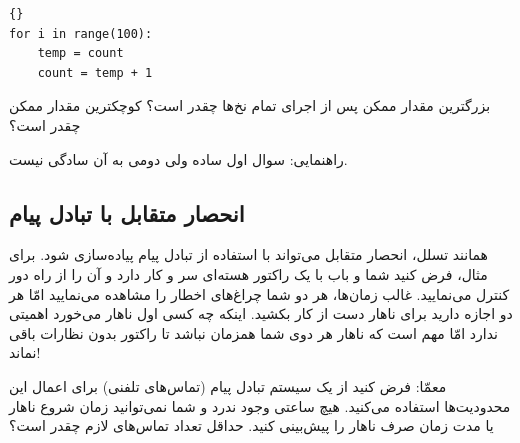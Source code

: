 \documentclass{book}
\begin{document}
\begin{latin}
\begin{latin}
\begin{lstlisting}[]{}
for i in range(100):
    temp = count
    count = temp + 1
\end{lstlisting}
\end{latin}
\end{latin}

    بزرگترین مقدار ممکن  پس از اجرای تمام نخ‌ها چقدر است؟ کوچکترین مقدار ممکن چقدر است؟ 
    

    راهنمایی: سوال اول ساده ولی دومی به آن سادگی نیست. 

\subsection {انحصار متقابل با تبادل پیام}


    همانند تسلل، انحصار متقابل می‌تواند با استفاده از تبادل پیام پیاده‌سازی شود. برای مثال، فرض کنید شما و باب 
    با یک راکتور هسته‌ای سر و کار دارد و آن را از راه دور کنترل می‌نمایید. غالب زمان‌ها، هر دو شما چراغ‌های اخطار را مشاهده می‌نمایید 
    امّا هر دو اجازه دارید برای ناهار  دست از کار بکشید. 
    اینکه چه کسی اول ناهار می‌خورد اهمیتی ندارد امّا مهم است که ناهار هر دوی شما همزمان نباشد تا راکتور بدون نظارات باقی نماند!

    معمّا: فرض کنید از یک سیستم تبادل پیام (تماس‌های تلفنی) برای اعمال این محدودیت‌ها استفاده می‌کنید. 
    هیچ ساعتی وجود ندرد و شما نمی‌توانید زمان شروع ناهار یا مدت زمان صرف ناهار را پیش‌بینی کنید. 
    حداقل تعداد تماس‌های لازم چقدر است؟
    
\end{document}
